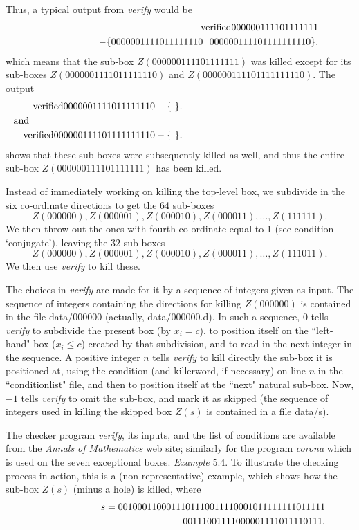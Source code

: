 Thus, a typical output from {\it verify} would be 
\begin{eqnarray*}
&&{\rm verified} 000000111101111111 \\
&&\qquad\qquad\quad- 
\{ 0000001111011111110 \ \ 000000111101111111110 \} .
\end{eqnarray*}
which means that the sub-box $Z(000000111101111111)$ was killed except for its sub-boxes
$Z(0000001111011111110)$  and $Z(000000111101111111110).$  The output 
\begin{eqnarray*}
&&{\rm verified} 0000001111011111110 - \{\ \}.\\
\noalign{\noindent and}
&&{\rm verified} 000000111101111111110 - \{\ \}.
\end{eqnarray*} shows that these sub-boxes were subsequently killed as well, and thus the entire sub-box
$Z(000000111101111111)$ has been killed. 


Instead of immediately working on killing the top-level box, we subdivide in the six co-ordinate directions to get the 64 sub-boxes $$Z(000000),Z(000001),Z(000010),Z(000011),\ldots, Z(111111).$$ 
\noindent We then throw out
the ones with fourth co-ordinate equal to 1 (see condition `conjugate'), leaving  the 32 sub-boxes
$$Z(000000),Z(000001),Z(000010),Z(000011),\ldots, Z(111011).$$  \noindent We then use {\it verify} to kill these.
\eject

The choices in {\it verify} are made for it by a sequence
of integers given as input.  The sequence of integers containing the directions for killing $Z(000000)$ is contained in the file data/000000 (actually, data/000000.d).
In such a sequence, 
$0$ tells {\it verify} to subdivide the present box (by $x_i = c$),  to position itself on the ``left-hand" box ($x_i \le c$)
created by that subdivision, and to read in the next integer in the sequence. A  positive integer $n$ tells {\it verify} to
kill directly the sub-box it is positioned at, using the condition (and killerword, if necessary) on line $n$ in the
``conditionlist" file,  and then to position itself at the ``next" natural sub-box.  Now,
$-1$ tells {\it verify} to omit the sub-box, and mark it as skipped
(the sequence of integers used in killing the skipped box $Z(s)$ is contained in a file data/s).


The checker program {\it verify}, its inputs, and the list of conditions
are available from the {\it Annals of Mathematics} web site; similarly for the program {\it corona} which is used on the
seven exceptional boxes.
{\it Example} 5.4.
To illustrate the checking process in action, this is a (non-representative)
example, which shows how the sub-box $Z(s)$ (minus a hole) is killed,
where
\begin{eqnarray*}
&&s=0010001100011101110011110001011111111011111\\
&&\hskip2in 00111001111000001111011110111. 
\end{eqnarray*}

